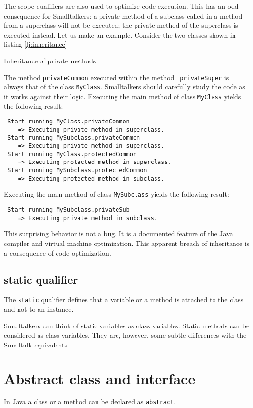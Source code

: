 \documentclass[twoside]{book}
\begin{document}
The scope qualifiers are also used to optimize code execution.
This has an odd consequence for Smalltalkers: a private method of
a subclass called in a method from a superclass will not be
executed; the private method of the superclass is executed
instead. Let us make an example. Consider the two classes shown in
listing \ref{lj:inheritance}
\begin{listing} Inheritance of private methods \label{lj:inheritance}


\end{listing}
The method {\tt privateCommon} executed within the method {\tt
privateSuper} is always that of the class {\tt MyClass}.
Smalltalkers should carefully study the code as it works against
their logic. Executing the main method of class {\tt MyClass}
yields the following result:
\begin{verbatim}
 Start running MyClass.privateCommon
    => Executing private method in superclass.
 Start running MySubclass.privateCommon
    => Executing private method in superclass.
 Start running MyClass.protectedCommon
    => Executing protected method in superclass.
 Start running MySubclass.protectedCommon
    => Executing protected method in subclass.
\end{verbatim}
Executing the main method of class {\tt MySubclass} yields the
following result:
\begin{verbatim}
 Start running MySubclass.privateSub
    => Executing private method in subclass.
\end{verbatim}
This surprising behavior is not a bug. It is a documented feature
of the Java compiler and virtual machine optimization. This
apparent breach of inheritance is a consequence of code
optimization.

\subsection{static qualifier}
The {\tt static} qualifier defines that a variable or a method is
attached to the class and not to an instance.

Smalltalkers can think of static variables as class variables.
Static methods can be considered as class variables. They are,
however, some subtle differences with the Smalltalk equivalents.

\section{Abstract class and interface}
In Java a class or a method can be declared as {\tt abstract}.
\end{document}
